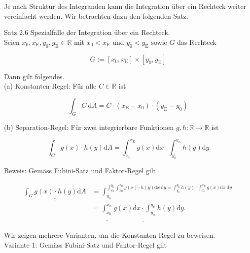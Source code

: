 \documentclass[10pt]{article}
\begin{document}
Je nach Struktur des Integranden kann die Integration über ein Rechteck weiter vereinfacht werden. Wir betrachten dazu den folgenden Satz.

Satz 2.6 Spezialfälle der Integration über ein Rechteck.\\
Seien $x_{0}, x_{\mathrm{E}}, y_{0}, y_{\mathrm{E}} \in \mathbb{R}$ mit $x_{0}<x_{\mathrm{E}}$ und $y_{0}<y_{\mathrm{E}}$ sowie $G$ das Rechteck


\begin{equation*}
G:=\left[x_{0}, x_{\mathrm{E}}\right] \times\left[y_{0}, y_{\mathrm{E}}\right] \tag{2.80}
\end{equation*}


Dann gilt folgendes.\\
(a) Konstanten-Regel: Für alle $C \in \mathbb{R}$ ist


\begin{equation*}
\int_{G} C \mathrm{~d} A=C \cdot\left(x_{\mathrm{E}}-x_{0}\right) \cdot\left(y_{\mathrm{E}}-y_{0}\right) \tag{2.81}
\end{equation*}


(b) Separation-Regel: Für zwei integrierbare Funktionen $g, h: \mathbb{R} \rightarrow \mathbb{R}$ ist


\begin{equation*}
\int_{G} g(x) \cdot h(y) \mathrm{d} A=\int_{x_{0}}^{x_{\mathrm{E}}} g(x) \mathrm{d} x \cdot \int_{y_{0}}^{y_{\mathrm{E}}} h(y) \mathrm{d} y \tag{2.82}
\end{equation*}


Beweis: Gemäss Fubini-Satz und Faktor-Regel gilt


\begin{align*}
\underline{\underline{\int_{G} g(x) \cdot h(y) \mathrm{d} A}} & =\int_{y_{0}}^{\int_{x_{0}}^{y_{\mathrm{E}}} \int_{x_{\mathrm{E}}}^{x_{\mathrm{E}}} g(x) \cdot h(y) \mathrm{d} x \mathrm{~d} y=\int_{y_{0}}^{y_{\mathrm{E}}} h(y) \cdot \int_{x_{0}}^{x_{\mathrm{E}}} g(x) \mathrm{d} x \mathrm{~d} y} \\
& =\underline{\underline{\int_{x_{0}}^{x_{\mathrm{E}}}} g(x) \mathrm{d} x \cdot \int_{y_{0}}^{y_{\mathrm{E}}} h(y) \mathrm{d} y .} \tag{2.83}
\end{align*}


Wir zeigen mehrere Varianten, um die Konstanten-Regel zu beweisen.\\
Variante 1: Gemäss Fubini-Satz und Faktor-Regel gilt
\end{document}
